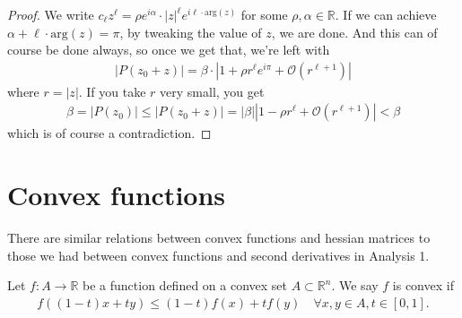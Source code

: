\begin{proof}
	We write $c_{\ell}z^{\ell} = \rho e^{i\alpha } \cdot \left| z \right|^{\ell} e^{i \ell \cdot \text{arg}(z)}$ for some $\rho, \alpha \in \mathbb{R}$. If we can achieve $\alpha + \ell \cdot \text{arg}(z) = \pi$, by tweaking the value of $z$, we are done. And this can of course be done always, so once we get that, we're left with
	\begin{align*}
		\left| P(z_{0} + z) \right| = \beta \cdot \left| 1 + \rho r^{\ell} e^{ i \pi } + \mathcal{O}(r^{\ell+1}) \right|
	\end{align*}
	where $r = \left| z \right|$. If you take $r$ very small, you get
	\begin{align*}
		\beta = \left| P(z_{0}) \right| \leq \left| P(z_{0} + z) \right| = \left| \beta \right||1 - \rho r^{\ell} + \mathcal{O} (r^{\ell + 1})| < \beta
	\end{align*}
	which is of course a contradiction.
\end{proof}

\section{Convex functions}

There are similar relations between convex functions and hessian matrices to those we had between convex functions and second derivatives in Analysis 1.

\begin{definition}[Convex]\label{def:convex-f}
	Let $f: A \to \mathbb{R}$ be a function defined on a convex set $A \subset \mathbb{R}^{n}$. We say $f$ is convex if
	\begin{align*}
		f((1-t)x + t y) \leq (1-t)f(x) + t f(y) \quad  \forall x,y \in A, t \in [0,1].
	\end{align*}
\end{definition}

